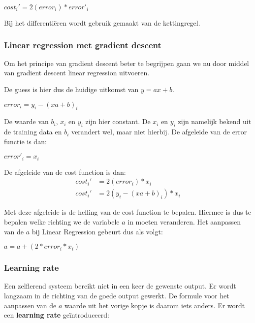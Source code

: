 \begin{center}
$ cost_i' = 2(error_i) * error'_i$
\end{center}

Bij het differenti\"{e}ren wordt gebruik gemaakt van de kettingregel.

\subsubsection{Linear regression met gradient descent}
Om het principe van gradient descent beter te begrijpen gaan we nu door middel van gradient descent linear regression uitvoeren.

De guess is hier dus de huidige uitkomst van $ y = ax + b $.

\begin{center}
$ error_{i} = y_{i} - (xa + b)_{i}$
\end{center}

De waarde van $ b_{i} $, $ x_{i} $ en $ y_{i} $ zijn hier constant. De $ x_{i} $ en $ y_{i} $ zijn namelijk bekend uit de training data en $ b_{i} $ verandert wel, maar niet hierbij. De afgeleide van de error functie is dan:

\begin{center}
$ error'_{i} = x_i$
\end{center}

De afgeleide van de cost function is dan:
\begin{align*}
cost_i' &= 2(error_i) * x_i \\
cost_i' &= 2(y_{i} - (xa + b)_{i}) * x_i
\end{align*}

Met deze afgeleide is de helling van de cost function te bepalen. Hiermee is dus te bepalen welke richting we de variabele $a$ in moeten veranderen. Het aanpassen van de $a$ bij Linear Regression gebeurt dus als volgt:

\begin{center}
$ a = a + (2 * error_i * x_i)$
\end{center}

\subsubsection{Learning rate}
\label{fig:LearningRate}
Een zelflerend systeem bereikt niet in een keer de gewenste output. Er wordt langzaam in de richting van de goede output gewerkt. De formule voor het aanpassen van de $a$ waarde uit het vorige kopje is daarom iets anders. Er wordt een \textbf{learning rate} ge\"{i}ntroduceerd:

